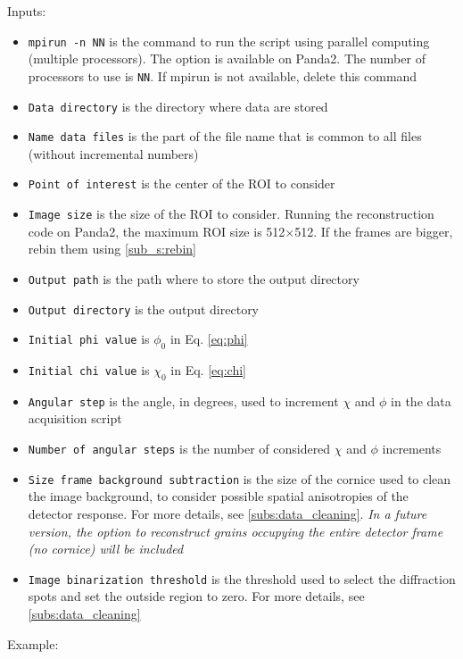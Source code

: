 \documentclass[11pt]{scrartcl}
\begin{document}
Inputs:

\begin{itemize}
    \item {\texttt{mpirun -n NN}} is the command to run the script using parallel computing (multiple processors). The option is available on Panda2. The number of processors to use is {\texttt{NN}}. If mpirun is not available, delete this command
    \item {\texttt{Data directory}} is the directory where data are stored
    \item {\texttt{Name data files}} is the part of the file name that is common to all files (without incremental numbers)
    \item {\texttt{Point of interest}} is the center of the {\footnotesize{ROI}} to consider
    \item {\texttt{Image size}} is the size of the {\footnotesize{ROI}} to consider. Running the reconstruction code on Panda2, the maximum {\footnotesize{ROI}} size is 512$\times$512. If the frames are bigger, rebin them using \ref{sub_s:rebin}
    \item {\texttt{Output path}} is the path where to store the output directory
    \item {\texttt{Output directory}} is the output directory
    \item {\texttt{Initial phi value}} is $\phi_0$ in Eq. \ref{eq:phi}
    \item {\texttt{Initial chi value}} is $\chi_0$ in Eq. \ref{eq:chi}
    \item {\texttt{Angular step}} is the angle, in degrees, used to increment $\chi$ and $\phi$ in the data acquisition script
    \item {\texttt{Number of angular steps}} is the number of considered $\chi$ and $\phi$ increments
    \item {\texttt{Size frame background subtraction}} is the size of the cornice used to clean the image background, to consider possible spatial anisotropies of the detector response. For more details, see {\ref{subs:data_cleaning}}. {\textit{In a future version, the option to reconstruct grains occupying the entire detector frame (no cornice) will be included}}
    \item {\texttt{Image binarization threshold}} is the threshold used to select the diffraction spots and set the outside region to zero. For more details, see {\ref{subs:data_cleaning}}
\end{itemize}

Example: 
\end{document}
